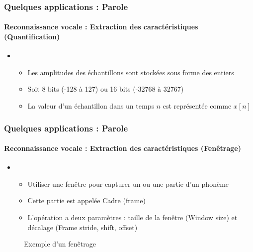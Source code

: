 \documentclass[xcolor=table]{beamer}
\begin{document}
\begin{frame}
	\frametitle{Quelques applications : Parole}
	\framesubtitle{Reconnaissance vocale : Extraction des caractéristiques (Quantification)}
	\begin{itemize}
		\item {}
		\begin{itemize}
			\item Les amplitudes des échantillons sont stockées sous forme des entiers
			\item Soit 8 bits (-128 à 127) ou 16 bits (-32768 à 32767)
			\item La valeur d'un échantillon dans un temps $n$ est représentée comme $x[n]$
		\end{itemize}
	\end{itemize}
\end{frame}

\begin{frame}
	\frametitle{Quelques applications : Parole}
	\framesubtitle{Reconnaissance vocale : Extraction des caractéristiques (Fenêtrage)}
	\begin{itemize}
		\item {}
		\begin{itemize}
			\item Utiliser une fenêtre pour capturer un ou une partie d'un phonème 
			\item Cette partie est appelée Cadre (frame)
			\item L'opération a deux paramètres : taille de la fenêtre (Window size) et décalage (Frame stride, shift, offset)
		\end{itemize}
	\end{itemize}
	\begin{figure}
		\centering
		\caption{Exemple d'un fenêtrage \cite{2020-jurafsky-martin}}
	\end{figure}
\end{frame}
\end{document}
